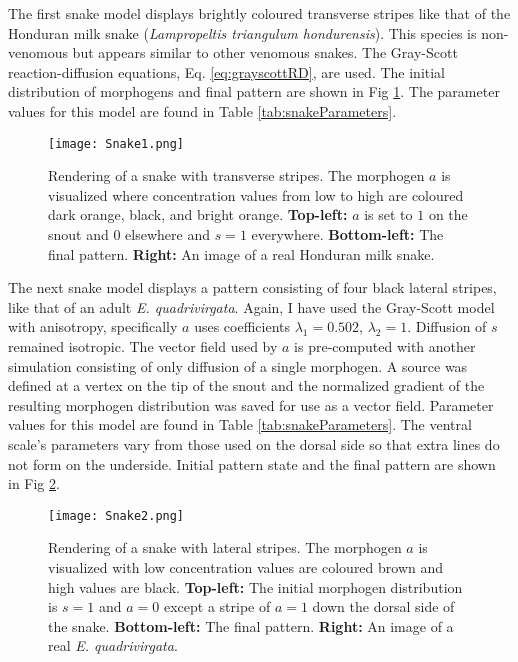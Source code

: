 The first snake model displays brightly coloured transverse stripes like that of the Honduran milk snake (\textit{Lampropeltis triangulum hondurensis}). This species is non-venomous but appears similar to other venomous snakes. The Gray-Scott reaction-diffusion equations, Eq. \ref{eq:grayscottRD}, are used. The initial distribution of morphogens and final pattern are shown in Fig \ref{fig:Snake1}. The parameter values for this model are found in Table \ref{tab:snakeParameters}.

\begin{figure}[ht]
	\centering
	\texttt{[image: Snake1.png]}
	\caption{Rendering of a snake with transverse stripes. The morphogen $a$ is visualized where concentration values from low to high are coloured dark orange, black, and bright orange. \textbf{Top-left:} $a$ is set to $1$ on the snout and $0$ elsewhere and $s=1$ everywhere. \textbf{Bottom-left:} The final pattern. \textbf{Right:} An image of a real Honduran milk snake.}
	\label{fig:Snake1}
\end{figure}

The next snake model displays a pattern consisting of four black lateral stripes, like that of an adult \textit{E. quadrivirgata}. Again, I have used the Gray-Scott model with anisotropy, specifically $a$ uses coefficients $\lambda_{1}=0.502$, $\lambda_{2}=1$. Diffusion of $s$ remained isotropic. The vector field used by $a$ is pre-computed with another simulation consisting of only diffusion of a single morphogen. A source was defined at a vertex on the tip of the snout and the normalized gradient of the resulting morphogen distribution was saved for use as a vector field. Parameter values for this model are found in Table \ref{tab:snakeParameters}. The ventral scale's parameters vary from those used on the dorsal side so that extra lines do not form on the underside. Initial pattern state and the final pattern are shown in Fig \ref{fig:Snake2}.

\begin{figure}[ht]
	\centering
	\texttt{[image: Snake2.png]}
	\caption{Rendering of a snake with lateral stripes. The morphogen $a$ is visualized with low concentration values are coloured brown and high values are black. \textbf{Top-left:} The initial morphogen distribution is $s=1$ and $a=0$ except a stripe of $a=1$ down the dorsal side of the snake. \textbf{Bottom-left:} The final pattern. \textbf{Right:} An image of a real \textit{E. quadrivirgata}.}
	\label{fig:Snake2}
\end{figure}

